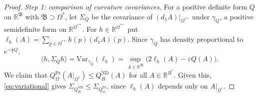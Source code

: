 \documentclass[11pt]{amsart}
\theoremstyle{plain}
\theoremstyle{definition}
\theoremstyle{remark}
\numberwithin{equation}{section}
\newcommand{\R}{\mathbb{R}}
\newcommand{\eps}{\varepsilon}
\newcommand{\fB}{\mathfrak{B}}
\newcommand{\ip}[2]{\langle #1,#2\rangle}
\begin{document}
\begin{proof}
\emph{Step 1: comparison of curvature covariances.} For a positive definite form $Q$ on $\R^\fB$ with $\fB\supset\Omega^*$, let $\Sigma_Q$ be the covariance of $(d_1A)|_{\Omega^{**}}$ under $\gamma_Q$, a positive semidefinite form on $\R^{\Omega^{**}}$. For $h\in\R^{\Omega^{**}}$ put $\ell_h(A)=\sum_{p\in\Omega^{**}}h(p)(d_1A)(p)$. Since $\gamma_Q$ has density proportional to $e^{-\frac\eps2Q}$,
\begin{equation}\label{eq:variational}
\ip h{\Sigma_Qh}=\mathrm{Var}_{\gamma_Q}(\ell_h)=\sup_{A\in\R^\fB}\big(2\ell_h(A)-\eps Q(A)\big).
\end{equation}
We claim that $Q^{\mathrm{Pr}}_\Omega(A|_{\Omega^*})\le Q^{\mathrm{ND}}_B(A)$ for all $A\in\R^{B^*}$. Given this, \eqref{eq:variational} gives $\Sigma_{Q^{\mathrm{ND}}_B}\le\Sigma_{Q^{\mathrm{Pr}}_\Omega}$, since $\ell_h(A)$ depends only on $A|_{\Omega^*}$.


\end{proof}
\end{document}
